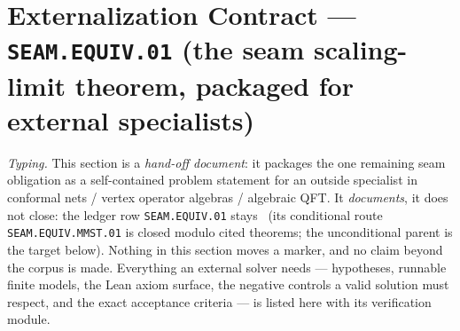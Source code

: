 \documentclass[11pt,a4paper]{article}
\begin{document}
\section*{Externalization Contract --- \texttt{SEAM.EQUIV.01} (the seam scaling-limit theorem, packaged for external specialists)}
\noindent\emph{Typing.} This section is a \emph{hand-off document}: it packages the one remaining
seam obligation as a self-contained problem statement for an outside specialist in conformal
nets / vertex operator algebras / algebraic QFT. It \emph{documents}, it does not close: the
ledger row \texttt{SEAM.EQUIV.01} stays \mO\ (its conditional route \texttt{SEAM.EQUIV.MMST.01}
is closed modulo cited theorems; the unconditional parent is the target below). Nothing in this
section moves a marker, and no claim beyond the corpus is made. Everything an external solver
needs --- hypotheses, runnable finite models, the Lean axiom surface, the negative controls a
valid solution must respect, and the exact acceptance criteria --- is listed here with its
verification module.
\end{document}
